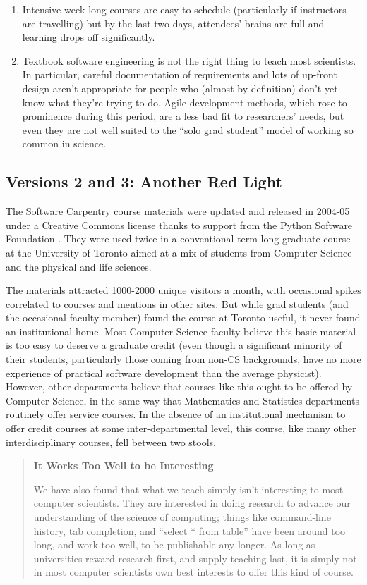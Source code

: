 \documentclass[10pt,a4paper,twocolumn]{article}
\begin{document}
\begin{enumerate}
\item
  Intensive week-long courses are easy to schedule (particularly if
  instructors are travelling) but by the last two days, attendees'
  brains are full and learning drops off significantly.
\item
  Textbook software engineering is not the right thing to teach most
  scientists. In particular, careful documentation of requirements and
  lots of up-front design aren't appropriate for people who (almost by
  definition) don't yet know what they're trying to do. Agile
  development methods, which rose to prominence during this period, are
  a less bad fit to researchers' needs, but even they are not well
  suited to the ``solo grad student'' model of working so common in
  science.
\end{enumerate}

\subsection*{Versions 2 and 3: Another Red Light}

The Software Carpentry course materials were updated and released in
2004-05 under a Creative Commons license thanks to support from the
Python Software Foundation \cite{wilson2006b}. They were used twice in
a conventional term-long graduate course at the University of Toronto
aimed at a mix of students from Computer Science and the physical and
life sciences.

The materials attracted 1000-2000 unique visitors a month, with
occasional spikes correlated to courses and mentions in other
sites. But while grad students (and the occasional faculty member)
found the course at Toronto useful, it never found an institutional
home.  Most Computer Science faculty believe this basic material is
too easy to deserve a graduate credit (even though a significant
minority of their students, particularly those coming from non-CS
backgrounds, have no more experience of practical software development
than the average physicist). However, other departments believe that
courses like this ought to be offered by Computer Science, in the same
way that Mathematics and Statistics departments routinely offer
service courses.  In the absence of an institutional mechanism to
offer credit courses at some inter-departmental level, this course,
like many other interdisciplinary courses, fell between two stools.

\begin{quote}
\textbf{It Works Too Well to be Interesting}

We have also found that what we teach simply isn't interesting to most
computer scientists. They are interested in doing research to advance
our understanding of the science of computing; things like command-line
history, tab completion, and ``select * from table'' have been around
too long, and work too well, to be publishable any longer. As long as
universities reward research first, and supply teaching last, it is
simply not in most computer scientists own best interests to offer this
kind of course.
\end{quote}
\end{document}

